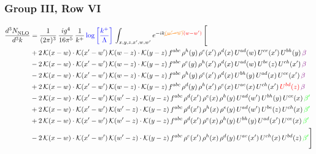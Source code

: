 \documentclass[9pt]{article}
\numberwithin{equation}{section}
\begin{document}
\subsubsection{Group III, Row VI}
\begin{align}
     \frac{d^{3}N_{\rm NLO}^{\rm}}{d^{3}k}  & = \frac{1}{(2\pi)^{3}}\, \frac{ig^{4}}{16\pi^{5}}\, \frac{1}{k^{+}}\, {\color{blue}\log{\left[\frac{k^{+}}{\Lambda}\right]}}\,\int_{x,y,z,x^{\prime},w,w^{\prime}}e^{-ik{\color{orange}\cancel{(w^{\prime}-w)}}{\color{red}(w-w^{\prime})}}\, \Bigg[\notag \\ & +2\,\mathcal{K}(x-w)\cdot\mathcal{K}(x'-w')\,\mathcal{K}(w-z)\cdot\mathcal{K}(y-z)\, f^{abc}\,\rho^{h}(y)\,\rho^{e}(x')\,\rho^{d}(x)\,U^{ad}(w)\,U^{ce}(x')\,U^{bh}(y)\,{\color{violet} \beta}\notag\\ &-2\,\mathcal{K}(x-w)\cdot\mathcal{K}(x'-w')\,\mathcal{K}(w-z)\cdot\mathcal{K}(y-z)\, f^{abc}\,\rho^{e}(y)\,\rho^{h}(x')\,\rho^{d}(x)\,U^{ad}(w)\,U^{be}(z)\,U^{ch}(x')\,{\color{violet} \beta}\notag \\ &-2\,\mathcal{K}(x-w)\cdot\mathcal{K}(x'-w')\,\mathcal{K}(w-z)\cdot\mathcal{K}(y-z)\, f^{abc}\,\rho^{h}(y)\,\rho^{e}(x')\,\rho^{d}(x)\,U^{bh}(y)\,U^{ad}(x)\,U^{ce}(x')\,{\color{violet} \beta}\notag\\ & +2\,\mathcal{K}(x-w)\cdot\mathcal{K}(x'-w')\,\mathcal{K}(w-z)\cdot\mathcal{K}(y-z)\, f^{abc}\,\rho^{d}(y)\,\rho^{h}(x')\,\rho^{e}(x)\,U^{ae}(x)\,U^{ch}(x')\,{\color{red}U^{bd}(z)}\,{\color{violet} \beta}\notag\\ & -2\, \mathcal{K}(x-w) \cdot \mathcal{K}(x'-w')\, \mathcal{K}(w'-z) \cdot \mathcal{K}(y-z)\, f^{abc}\, \rho^{d}(x')\,\rho^{e}(x)\, \rho^{h}(y)\,U^{ad}(w')\,U^{bh}(y)\,U^{ce}(x)\, {\color{green} \beta'}\notag \\ & + 2\, \mathcal{K}(x-w) \cdot \mathcal{K}(x'-w')\, \mathcal{K}(w'-z) \cdot \mathcal{K}(y-z)\, f^{abc}\, \rho^{d}(x')\,\rho^{h}(x)\, \rho^{e}(y)\,U^{ad}(w')\,U^{be}(z)\,U^{ch}(x)\, {\color{green} \beta'}\notag \\ & +2\, \mathcal{K}(x-w) \cdot \mathcal{K}(x'-w')\, \mathcal{K}(w'-z) \cdot \mathcal{K}(y-z)\, f^{abc}\, \rho^{d}(x')\,\rho^{e}(x)\, \rho^{h}(y)\,U^{bh}(y)\,U^{ad}(x')\,U^{ce}(x)\, {\color{green} \beta'}\notag \\ & -2\, \mathcal{K}(x-w) \cdot \mathcal{K}(x'-w')\, \mathcal{K}(w'-z) \cdot \mathcal{K}(y-z)\, f^{abc}\, \rho^{e}(x')\,\rho^{h}(x)\, \rho^{d}(y)\,U^{ae}(x')\,U^{ch}(x)\,U^{bd}(z)\, {\color{green} \beta'}\Bigg]
\end{align}  
\end{document}
